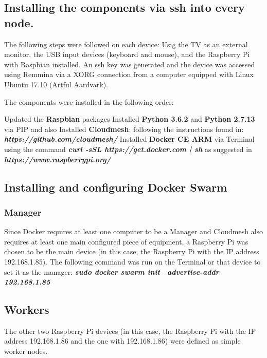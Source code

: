 	\subsection{Installing the components via ssh into every node.}
	
	The following steps were followed on each device:
	Usig the TV as an external monitor, the USB input devices
  (keyboard and mouse), and the Raspberry Pi with Raspbian
  installed. An ssh key was generated and the device was 
  accessed using Remmina via a XORG connection from a 
  computer equipped with Linux Ubuntu 17.10 (Artful Aardvark).
  
	The components were installed in the following order:
	
	Updated the \textbf{Raspbian} packages \textbf{\textit{}}
	Installed \textbf{Python 3.6.2} and 
  \textbf{Python 2.7.13} via PIP 
  and also 
	Installed \textbf{Cloudmesh}: 
  following the instructions found in: 
  \textbf{\textit{https://github.com/cloudmesh/}}
	Installed \textbf{Docker CE ARM} via Terminal using the command 
  \textbf{\textit{curl -sSL https://get.docker.com | sh}}
	as suggested in\\ \textbf{\textit{https://www.raspberrypi.org/}}

	
	\subsection{Installing and configuring Docker Swarm}
  
	\subsubsection{Manager}
	Since Docker requires at least one computer to be a 
  Manager and Cloudmesh also requires at least one main configured
  piece of equipment, a Raspberry Pi was chosen to be the main
  device (in this case, the Raspberry Pi with the IP address 192.168.1.85). 
  The following command was run on the Terminal or that 
  device to set it as the manager: 
  \textbf{\textit{sudo docker swarm init --advertise-addr 192.168.1.85}}
	
  \subsection{Workers}
	The other two Raspberry Pi devices (in this case, the Raspberry 
  Pi with the IP address 192.168.1.86 and the one with 192.168.1.86) 
  were defined as simple worker nodes.
  
